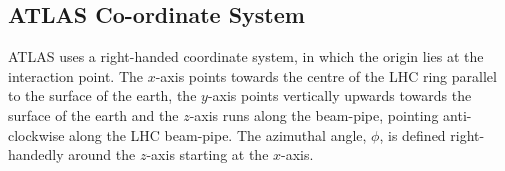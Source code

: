 
\subsection{ATLAS Co-ordinate System}
\label{sec:det-coordinate}

ATLAS uses a right-handed coordinate system, in which the origin lies at the interaction point.
The $x$-axis points towards the centre of the LHC ring parallel to the surface of the earth,
the $y$-axis points vertically upwards towards the surface of the earth
and the $z$-axis runs along the beam-pipe, pointing anti-clockwise along the LHC beam-pipe.
The azimuthal angle, $\phi$, is defined right-handedly around the $z$-axis starting at the $x$-axis.

